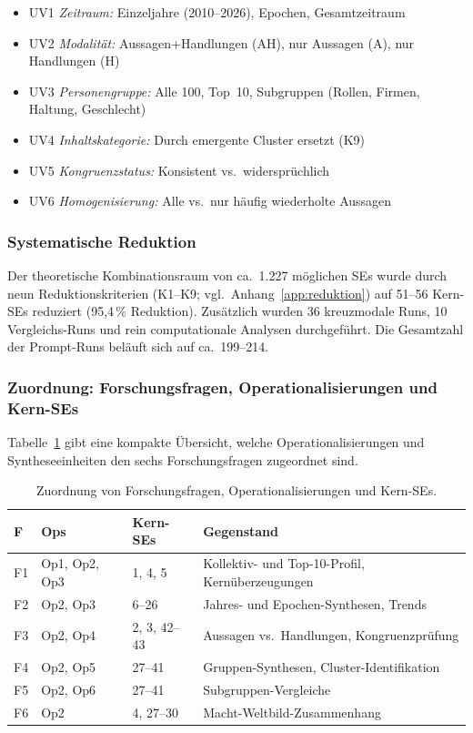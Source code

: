 \documentclass[12pt,a4paper]{article}
\begin{document}
\begin{itemize}[nosep]
  \item UV1 \emph{Zeitraum:} Einzeljahre (2010--2026), Epochen, Gesamtzeitraum
  \item UV2 \emph{Modalit\"at:} Aussagen+Handlungen (AH), nur Aussagen (A), nur Handlungen (H)
  \item UV3 \emph{Personengruppe:} Alle 100, Top~10, Subgruppen (Rollen, Firmen, Haltung, Geschlecht)
  \item UV4 \emph{Inhaltskategorie:} Durch emergente Cluster ersetzt (K9)
  \item UV5 \emph{Kongruenzstatus:} Konsistent vs.\ widerspr\"uchlich
  \item UV6 \emph{Homogenisierung:} Alle vs.\ nur h\"aufig wiederholte Aussagen
\end{itemize}

\subsubsection{Systematische Reduktion}

Der theoretische Kombinationsraum von ca.\ 1.227 m\"oglichen SEs wurde durch neun Reduktionskriterien (K1--K9; vgl.\ Anhang~\ref{app:reduktion}) auf 51--56 Kern-SEs reduziert (95,4\,\% Reduktion). Zus\"atzlich wurden 36 kreuzmodale Runs, 10 Vergleichs-Runs und rein computationale Analysen durchgef\"uhrt. Die Gesamtzahl der Prompt-Runs bel\"auft sich auf ca.\ 199--214.

\subsubsection{Zuordnung: Forschungsfragen, Operationalisierungen und Kern-SEs}

Tabelle~\ref{tab:zuordnung} gibt eine kompakte \"Ubersicht, welche Operationalisierungen und Syntheseeinheiten den sechs Forschungsfragen zugeordnet sind.

\begin{table}[htbp]
  \centering
  \caption{Zuordnung von Forschungsfragen, Operationalisierungen und Kern-SEs.}
  \label{tab:zuordnung}
  \footnotesize
  \begin{tabularx}{\textwidth}{l l l X}
    \toprule
    \textbf{F} & \textbf{Ops} & \textbf{Kern-SEs} & \textbf{Gegenstand} \\
    \midrule
    F1 & Op1, Op2, Op3 & 1, 4, 5 & Kollektiv- und Top-10-Profil, Kern\"uberzeugungen \\
    F2 & Op2, Op3 & 6--26 & Jahres- und Epochen-Synthesen, Trends \\
    F3 & Op2, Op4 & 2, 3, 42--43 & Aussagen vs.\ Handlungen, Kongruenzpr\"ufung \\
    F4 & Op2, Op5 & 27--41 & Gruppen-Synthesen, Cluster-Identifikation \\
    F5 & Op2, Op6 & 27--41 & Subgruppen-Vergleiche \\
    F6 & Op2 & 4, 27--30 & Macht-Weltbild-Zusammenhang \\
    \bottomrule
  \end{tabularx}
\end{table}
\end{document}
